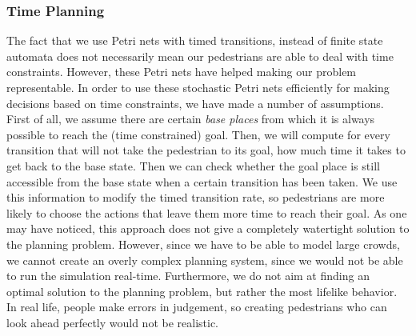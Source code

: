 \documentclass[11pt]{article}
\begin{document}
\subsubsection{Time Planning}
The fact that we use Petri nets with timed transitions, instead of finite state automata does not necessarily mean our pedestrians are able to deal with time constraints. However, these Petri nets have helped making our problem representable. In order to use these stochastic Petri nets efficiently for making decisions based on time constraints, we have made a number of assumptions.\\
First of all, we assume there are certain \emph{base places} from which it is always possible to reach the (time constrained) goal. Then, we will compute for every transition that will not take the pedestrian to its goal, how much time it takes to get back to the base state. Then we can check whether the goal place is still accessible from the base state when a certain transition has been taken. We use this information to modify the timed transition rate, so pedestrians are more likely to choose the actions that leave them more time to reach their goal.
As one may have noticed, this approach does not give a completely watertight solution to the planning problem. However, since we have to be able to model large crowds, we cannot create an overly complex planning system, since we would not be able to run the simulation real-time. Furthermore, we do not aim at finding an optimal solution to the planning problem, but rather the most lifelike behavior. In real life, people make errors in judgement, so creating pedestrians who can look ahead perfectly would not be realistic.
\end{document}
